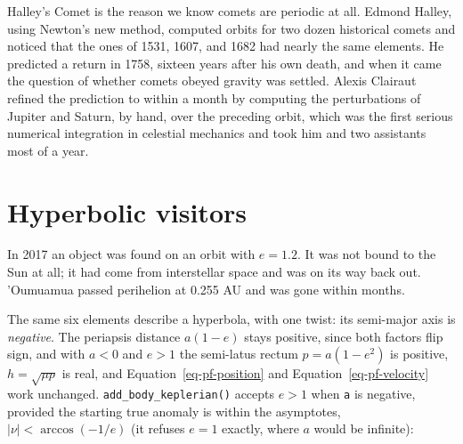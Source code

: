 \documentclass[
  10.5pt,
  letterpaper,
]{scrbook}
\theoremstyle{plain}
\theoremstyle{remark}
\begin{document}
\begin{tcolorbox}[enhanced jigsaw, arc=.35mm, bottomrule=.15mm, bottomtitle=1mm, breakable, colback=white, colbacktitle=quarto-callout-note-color!10!white, colframe=quarto-callout-note-color-frame, coltitle=black, left=2mm, leftrule=.75mm, opacityback=0, opacitybacktitle=0.6, rightrule=.15mm, title={Where it comes from}, titlerule=0mm, toprule=.15mm, toptitle=1mm]

Halley's Comet is the reason we know comets are periodic at all. Edmond
Halley, using Newton's new method, computed orbits for two dozen
historical comets and noticed that the ones of 1531, 1607, and 1682 had
nearly the same elements. He predicted a return in 1758, sixteen years
after his own death, and when it came the question of whether comets
obeyed gravity was settled. Alexis Clairaut refined the prediction to
within a month by computing the perturbations of Jupiter and Saturn, by
hand, over the preceding orbit, which was the first serious numerical
integration in celestial mechanics and took him and two assistants most
of a year.

\end{tcolorbox}

\section{Hyperbolic visitors}\label{hyperbolic-visitors}

In 2017 an object was found on an orbit with \(e = 1.2\). It was not
bound to the Sun at all; it had come from interstellar space and was on
its way back out. 'Oumuamua passed perihelion at 0.255 AU and was gone
within months.

The same six elements describe a hyperbola, with one twist: its
semi-major axis is \emph{negative}. The periapsis distance \(a(1-e)\)
stays positive, since both factors flip sign, and with \(a < 0\) and
\(e > 1\) the semi-latus rectum \(p = a(1-e^2)\) is positive,
\(h = \sqrt{\mu p}\) is real, and Equation~\ref{eq-pf-position} and
Equation~\ref{eq-pf-velocity} work unchanged.
\texttt{add\_body\_keplerian()} accepts \(e > 1\) when \texttt{a} is
negative, provided the starting true anomaly is within the asymptotes,
\(|\nu| < \arccos(-1/e)\) (it refuses \(e = 1\) exactly, where \(a\)
would be infinite):
\end{document}
